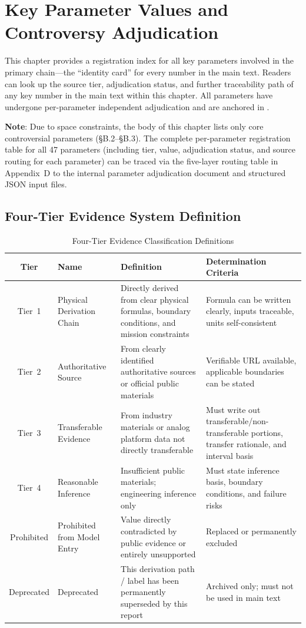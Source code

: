 
\section{Key Parameter Values and Controversy Adjudication}

This chapter provides a registration index for all key parameters involved in the primary chain---the ``identity card'' for every number in the main text. Readers can look up the source tier, adjudication status, and further traceability path of any key number in the main text within this chapter. All parameters have undergone per-parameter independent adjudication and are anchored in .

\textbf{Note}: Due to space constraints, the body of this chapter lists only core controversial parameters (\S B.2--\S B.3). The complete per-parameter registration table for all 47 parameters (including tier, value, adjudication status, and source routing for each parameter) can be traced via the five-layer routing table in Appendix~D to the internal parameter adjudication document and structured JSON input files.

\subsection{Four-Tier Evidence System Definition}

\begin{table}[H]
  \centering
  \caption{Four-Tier Evidence Classification Definitions}
  \label{tab:evidence-tiers}
  \small
  \begin{tabular}{cp{1.8cm}p{4.2cm}p{5.2cm}}
  \toprule
  \textbf{Tier} & \textbf{Name} & \textbf{Definition} & \textbf{Determination Criteria} \\
  \midrule
  Tier~1 & Physical Derivation Chain & Directly derived from clear physical formulas, boundary conditions, and mission constraints & Formula can be written clearly, inputs traceable, units self-consistent \\
  Tier~2 & Authoritative Source & From clearly identified authoritative sources or official public materials & Verifiable URL available, applicable boundaries can be stated \\
  Tier~3 & Transferable Evidence & From industry materials or analog platform data not directly transferable & Must write out transferable/non-transferable portions, transfer rationale, and interval basis \\
  Tier~4 & Reasonable Inference & Insufficient public materials; engineering inference only & Must state inference basis, boundary conditions, and failure risks \\
  Prohibited & Prohibited from Model Entry & Value directly contradicted by public evidence or entirely unsupported & Replaced or permanently excluded \\
  Deprecated & Deprecated & This derivation path / label has been permanently superseded by this report & Archived only; must not be used in main text \\
  \bottomrule
  \end{tabular}
\end{table}

